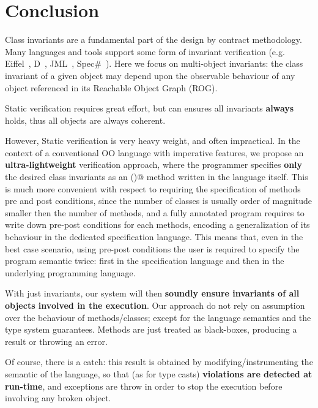 \saveSpace
\section{Conclusion}
\label{s:conclusion}
\saveSpace
Class invariants are a fundamental part of the design by contract methodology. 
Many languages and tools support some form of invariant verification (e.g. Eiffel~\cite{Meyer:1992:EL:129093}, D~\cite{Alexandrescu:2010:DPL:1875434}, JML~\cite{Burdy2005}, Spec\#~\cite{Barnett:2004:SPS:2131546.2131549}).
Here we focus on multi-object invariants: the class invariant of a given object may depend upon the observable behaviour of any object referenced in its Reachable Object Graph (ROG).

Static verification requires great effort, but can ensures all invariants \textbf{always} holds, thus all objects are always coherent.

However, Static verification is very heavy weight, and often impractical.
In the context of a conventional OO language with imperative features,
we propose an \textbf{ultra-lightweight} verification approach,
where the programmer specifies \textbf{only} the desired class invariants as an 
\Q@invariant()@ method written in the language itself.
This is much more convenient with respect to requiring the specification of methods pre and post conditions,
since the number of classes is usually order of magnitude smaller then the number of methods,
and a fully annotated program requires to write down 
pre-post conditions for each methods, encoding a generalization of its behaviour
in the dedicated specification language.
This means that, even in the best case scenario, 
using pre-post conditions
the user is required to specify the program semantic twice:
first in the specification language and then in the underlying programming language.


With just invariants, our system will then 
\textbf{soundly ensure invariants of all objects involved in the execution}.
Our approach do not rely on assumption over the behaviour of methods/classes;
except for the language semantics and the type system guarantees.
Methods are just treated as black-boxes, producing a result or throwing an error.

Of course, there is a catch: this result is obtained by modifying/instrumenting the
semantic of the language, so that (as for type casts) \textbf{violations are detected at run-time}, and exceptions
are throw in order to stop the execution before involving any broken object.

